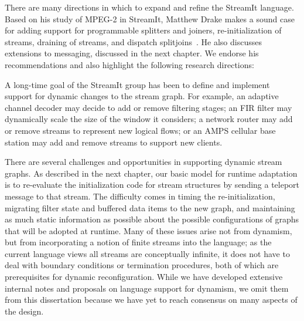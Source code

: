 There are many directions in which to expand and refine the StreamIt
language.  Based on his study of MPEG-2 in StreamIt, Matthew Drake
makes a sound case for adding support for programmable splitters and
joiners, re-initialization of streams, draining of streams, and
dispatch splitjoins~\cite{drake-thesis}.  He also discusses extensions
to messaging, discussed in the next chapter.  We endorse his
recommendations and also highlight the following research directions:


\mybegin

  A long-time goal of
  the StreamIt group has been to define and implement support for
  dynamic changes to the stream graph.  For example, an adaptive
  channel decoder may decide to add or remove filtering stages; an FIR
  filter may dynamically scale the size of the window it considers; a
  network router may add or remove streams to represent new logical
  flows; or an AMPS cellular base station may add and remove streams
  to support new clients.

  There are several challenges and opportunities in supporting dynamic
  stream graphs.  As described in the next chapter, our basic model
  for runtime adaptation is to re-evaluate the initialization code for
  stream structures by sending a teleport message to that stream.  The
  difficulty comes in timing the re-initialization, migrating filter
  state and buffered data items to the new graph, and maintaining as
  much static information as possible about the possible
  configurations of graphs that will be adopted at runtime.  Many of
  these issues arise not from dynamism, but from incorporating a
  notion of finite streams into the language; as the current language
  views all streams are conceptually infinite, it does not have to
  deal with boundary conditions or termination procedures, both of
  which are prerequisites for dynamic reconfiguration.  While we have
  developed extensive internal notes and proposals on language support
  for dynamism, we omit them from this dissertation because we have
  yet to reach consensus on many aspects of the design.

